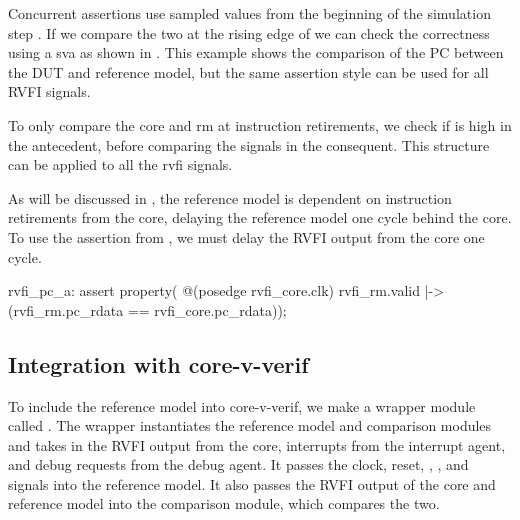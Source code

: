 Concurrent assertions use sampled values from the beginning of the simulation step \cite{cernySVAPowerAssertions2015}. 
If we compare the two at the rising edge of  we can check the correctness using a \acrshort{sva} as shown in . This example shows the comparison of the PC between the DUT and reference model, but the same assertion style can be used for all RVFI signals.

To only compare the core and \acrshort{rm} at instruction retirements, we check if  is high in the antecedent, before comparing the  signals in the consequent. This structure can be applied to all the \acrshort{rvfi} signals.

As will be discussed in , the reference model is dependent on instruction retirements from the core, delaying the reference model one cycle behind the core. To use the assertion from , we must delay the RVFI output from the core one cycle.

\begin{systemverilog}[caption={Assertion comparing the PC of the \acrshort{rm} and core.}, label={lst:pc_assertion}]
rvfi_pc_a: assert property( @(posedge rvfi_core.clk)
    rvfi_rm.valid |-> (rvfi_rm.pc_rdata == rvfi_core.pc_rdata));
\end{systemverilog}




\subsection{Integration with core-v-verif}

To include the reference model into core-v-verif, we make a wrapper module called . The wrapper instantiates the reference model and comparison modules and takes in the RVFI output from the core, interrupts from the interrupt agent, and debug requests from the debug agent. It passes the clock, reset, , , and  signals into the reference model.
It also passes the RVFI output of the core and reference model into the comparison module, which compares the two.



